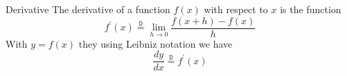 \documentclass[preview]{standalone}
\begin{document}
\begin{defn*}{Derivative}
  The derivative of a function $f\left(x\right)$ with respect to $x$ is the function
  \[
    f^\prime\left(x\right) \stackrel{\mathtt{D}}{=} \lim_{h\to 0} \frac{f\left(x  +  h\right)  -  f\left(x\right)}{h}
  \]
  With $y = f\left(x\right)$ they using Leibniz notation we have
  \[
  \frac{dy}{dx} \stackrel{\mathtt{D}}{=} f ^{\prime}\left(x\right)
  \]
\end{defn*}
\end{document}
